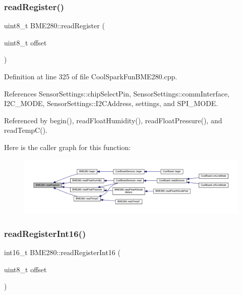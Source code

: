 \subsubsection{\texorpdfstring{read\+Register()}{readRegister()}}
{\footnotesize\ttfamily uint8\+\_\+t B\+M\+E280\+::read\+Register (\begin{DoxyParamCaption}\item[{uint8\+\_\+t}]{offset }\end{DoxyParamCaption})}



Definition at line 325 of file Cool\+Spark\+Fun\+B\+M\+E280.\+cpp.



References Sensor\+Settings\+::chip\+Select\+Pin, Sensor\+Settings\+::comm\+Interface, I2\+C\+\_\+\+M\+O\+DE, Sensor\+Settings\+::\+I2\+C\+Address, settings, and S\+P\+I\+\_\+\+M\+O\+DE.



Referenced by begin(), read\+Float\+Humidity(), read\+Float\+Pressure(), and read\+Temp\+C().

Here is the caller graph for this function\+:
\nopagebreak
\begin{figure}[H]
\begin{center}
\leavevmode
\includegraphics[width=350pt]{df/dcf/class_b_m_e280_a1bbd14c8591966df531e40085342ff71_icgraph}
\end{center}
\end{figure}
\mbox{\label{class_b_m_e280_ac43c30f9b321d301694094d6b4bebe7e}} 
\subsubsection{\texorpdfstring{read\+Register\+Int16()}{readRegisterInt16()}}
{\footnotesize\ttfamily int16\+\_\+t B\+M\+E280\+::read\+Register\+Int16 (\begin{DoxyParamCaption}\item[{uint8\+\_\+t}]{offset }\end{DoxyParamCaption})}



